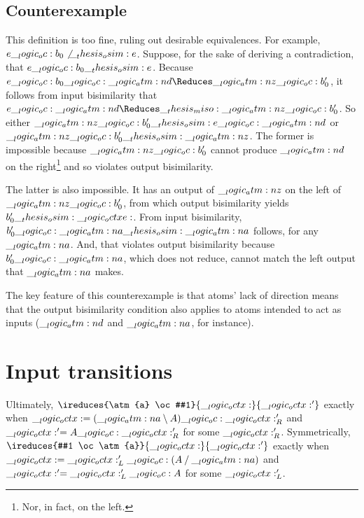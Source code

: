 \subsection{Counterexample}


This definition is too fine, ruling out desirable equivalences.
For example, $e \__logic_oc: b_0 \not\__thesis_osim: e$.
Suppose, for the sake of deriving a contradiction, that $e \__logic_oc: b_0 \__thesis_osim: e$.
Because $e \oc b_0 \oc \atm{d} \Reduces \atm{z} \oc b'_0$, it follows from input bisimilarity that $e \oc \atm{d} \Reduces\miso \atm{z} \oc b'_0$.
So either $\__logic_atm:n {z} \__logic_oc: b'_0 \__thesis_osim: e \__logic_oc: \__logic_atm:n {d}$ or $\__logic_atm:n {z} \__logic_oc: b'_0 \__thesis_osim: \__logic_atm:n {z}$.
The former is impossible because $\__logic_atm:n {z} \__logic_oc: b'_0$ cannot produce $\__logic_atm:n {d}$ on the right\footnote{Nor, in fact, on the left.} and so violates output bisimilarity.

The latter is also impossible.
It has an output of $\__logic_atm:n {z}$ on the left of $\__logic_atm:n {z} \__logic_oc: b'_0$, from which output bisimilarity yields $b'_0 \__thesis_osim: \__logic_octxe:$.
From input bisimilarity, $b'_0 \__logic_oc: \__logic_atm:n {a} \__thesis_osim: \__logic_atm:n {a}$ follows, for any $\__logic_atm:n {a}$.
And, that violates output bisimilarity because $b'_0 \__logic_oc: \__logic_atm:n {a}$, which does not reduce, cannot match the left output that $\__logic_atm:n {a}$ makes.

The key feature of this counterexample is that atoms' lack of direction means that the output bisimilarity condition also applies to atoms intended to act as inputs ($\__logic_atm:n {d}$ and $\__logic_atm:n {a}$, for instance).


\section{Input transitions}

Ultimately, $\ireduces{\atm{a} \oc #1}{\octx}{\octx'}$ exactly when $\__logic_octx: = (\__logic_atm:n {a} \mathbin { \setminus } A) \__logic_oc: \__logic_octx:'_R$ and $\__logic_octx:' = A \__logic_oc: \__logic_octx:'_R$ for some $\__logic_octx:'_R$.
Symmetrically, $\ireduces{#1 \oc \atm{a}}{\octx}{\octx'}$ exactly when $\__logic_octx: = \__logic_octx:'_L \__logic_oc: (A \mathbin { / } \__logic_atm:n {a})$ and $\__logic_octx:' = \__logic_octx:'_L \__logic_oc: A$ for some $\__logic_octx:'_L$.

